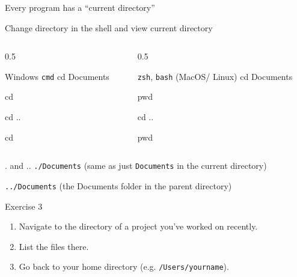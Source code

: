 \documentclass[xcolor={svgnames,x11names,dvipsnames}]{beamer}
\newcommand{\cmd}{}
\begin{document}
\begin{frame} [fragile] {Every program has a ``current directory''}

Change directory in the shell and view current directory
\vspace{-10pt}

\begin{columns}[t]
\begin{column}{0.5\textwidth}
\begin{block}{Windows {\tt cmd}}
\cmd{cd Documents}

\cmd{cd}

\cmd{cd ..}

\cmd{cd}
\end{block}
\end{column}
\begin{column}{0.5\textwidth}

\begin{block}{{\tt zsh}, {\tt bash} (MacOS/ Linux)}
\cmd{cd Documents}

\cmd{pwd}

\cmd{cd ..}

\cmd{pwd}
\end{block}
\end{column}
\end{columns}

\vspace{20pt}


\begin{block}{. and ..}
\verb=./Documents=  (same as just \verb=Documents= in the current directory)

\verb=../Documents= (the Documents folder in the parent directory)
\end{block}


\vspace{30pt}

\pause
\begin{block}{Exercise 3}
\begin{enumerate} 
\item Navigate to the directory of a project you've worked on recently.
\item List the files there.
\item Go back to your home directory (e.g. {\tt /Users/yourname}).
\end{enumerate}
\end{block}
\end{frame}
\end{document}
